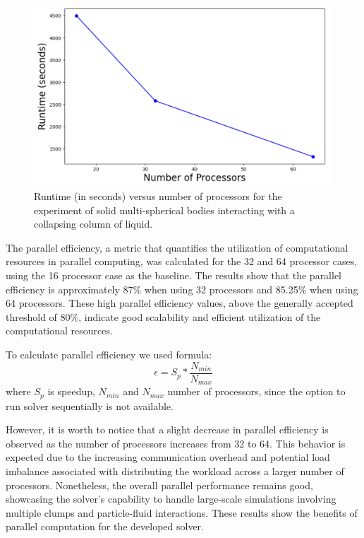 
\begin{figure}[H]
    \centering
    \includegraphics[width=15cm]{GWU_Thesis_Sarmakeeva/Images/chap3/parallel_runtime.png}
    \caption{Runtime (in seconds) versus number of processors for the experiment of solid multi-spherical bodies interacting with a collapsing column of liquid. }
    \label{fig:runtime}
\end{figure}

The parallel efficiency, a metric that quantifies the utilization of computational resources in parallel computing, was calculated for the 32 and 64 processor cases, using the 16 processor case as the baseline. The results show that the parallel efficiency is approximately 87\% when using 32 processors and 85.25\% when using 64 processors. These high parallel efficiency values, above the generally accepted threshold of 80\%, indicate good scalability and efficient utilization of the computational resources.

To calculate parallel efficiency we used formula:
$$\epsilon = S_p * \frac {N_{min}}{N_{max}}$$
where $S_p$ is speedup, $N_{min}$ and $N_{max}$ number of processors, since the option to run solver sequentially is not available.

However, it is worth to notice that a slight decrease in parallel efficiency is observed as the number of processors increases from 32 to 64. This behavior is expected due to the increasing communication overhead and potential load imbalance associated with distributing the workload across a larger number of processors. Nonetheless, the overall parallel performance remains good, showcasing the solver's capability to handle large-scale simulations involving multiple clumps and particle-fluid interactions. These results show the benefits of parallel computation for the developed solver.

